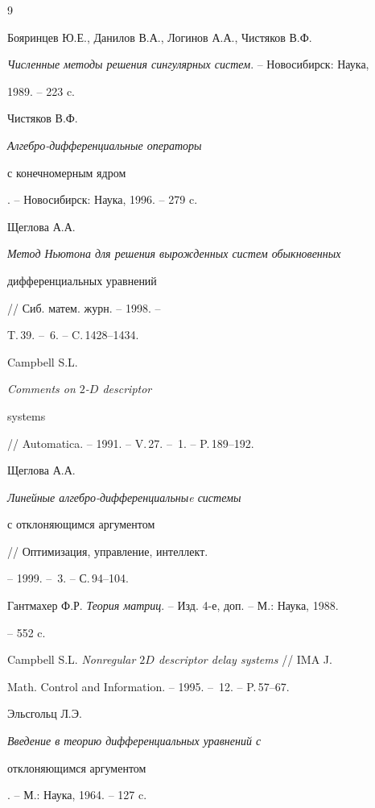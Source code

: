\begin{thebibliography}{9}







Бояринцев Ю.Е., Данилов В.А., Логинов А.А., Чистяков В.Ф.


{\em Численные методы решения сингулярных систем}. -- Новосибирск: Наука,


1989. -- 223 c.




Чистяков В.Ф.


{\em Алгебро-дифференциальные операторы


с конечномерным ядром}. -- Новосибирск: Наука, 1996. -- 279 c.




Щеглова А.А. {\em Метод Ньютона для решения вырожденных систем обыкновенных


дифференциальных уравнений} // Сиб. матем. журн. -- 1998. --


T.\,39. -- \No\,6. -- C.\,1428--1434.




Campbell S.L. {\em Comments on $2$-$D$ descriptor 


systems} // Automatica. -- 1991. -- V.\,27. -- \No\,1. -- P.\,189--192. 




Щеглова А.А. {\em Линейные алгебро-дифференциальныe системы 


с отклоняющимся аргументом} // Оптимизация, управление, интеллект. 


-- 1999. -- \No\,3. -- С.\,94--104.




Гантмахер Ф.Р. {\em Теория матриц}. -- Изд. 4-е, доп. -- М.: Наука, 1988.


-- 552 c.




Campbell S.L. {\em Nonregular $2D$ descriptor delay systems} // IMA J.


Math. Control and Information. -- 1995. -- \No\,12. -- P.\,57--67.




Эльсгольц Л.Э. {\em Введение в теорию дифференциальных уравнений с


отклоняющимся аргументом}. -- М.: Наука, 1964. -- 127 c.





\end{thebibliography}





\vskip 2cm














\label{end}












